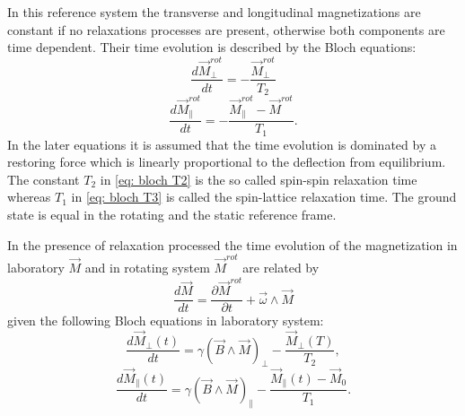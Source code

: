In this reference system the transverse and longitudinal magnetizations are constant if no relaxations processes are present, otherwise both components are time dependent. Their time evolution is described by the Bloch equations:
\begin{equation}
\label{eq: bloch T2}
\frac{d\vec{M}_\perp^{rot}}{dt} = -\frac{\vec{M}_\perp^{rot}}{T_2}
\end{equation}
\begin{equation}
\label{eq: bloch T3}
\frac{d\vec{M}_\parallel^{rot}}{dt} = -\frac{\vec{M}_\parallel^{rot} - \vec{M}^{rot}}{T_1}.
\end{equation}
In the later equations it is assumed that the time evolution is dominated by a restoring force which is linearly proportional to the deflection from equilibrium. The constant $T_2$ in \ref{eq: bloch T2} is the so called spin-spin relaxation time whereas $T_1$ in \ref{eq: bloch T3} is called the spin-lattice relaxation time. The ground state is equal in the rotating and the static reference frame. 

In the presence of relaxation processed the time evolution of the magnetization in laboratory $\vec{M}$ and in rotating system $\vec{M}^{rot}$ are related by 
\begin{equation}
 \frac{d \vec{M}}{dt} = \frac{\partial \vec{M}^{rot}}{\partial t} + \vec{\omega}\wedge\vec{M}
 \end{equation}
 given the following Bloch equations in laboratory system:
 \begin{equation}
 \label{bloch + rot T2}
   \frac{d \vec{M}_{\perp}(t)}{dt} = \gamma(\vec{B}\wedge\vec{M})_\perp - \frac{\vec{M}_\perp (T)}{T_2},
  \end{equation} 
  \begin{equation}
  \label{bloch + rot T1}
     \frac{d \vec{M}_{\parallel}(t)}{dt} = \gamma(\vec{B}\wedge\vec{M})_\parallel  -\frac{\vec{M}_\parallel (t)-\vec{M}_0}{T_1}.
  \end{equation}
